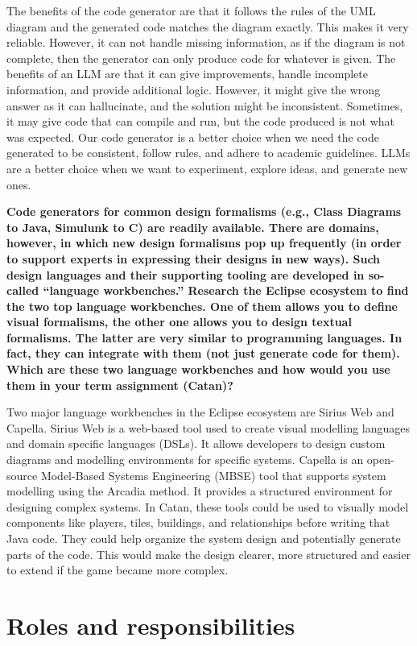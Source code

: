 The benefits of the code generator are that it follows the rules of the UML diagram and the generated code matches the diagram exactly. This makes it very reliable. However, it can not handle missing information, as if the diagram is not complete, then the generator can only produce code for whatever is given. The benefits of an LLM are that it can give improvements, handle incomplete information, and provide additional logic. However, it might give the wrong answer as it can hallucinate, and the solution might be inconsistent. Sometimes, it may give code that can compile and run, but the code produced is not what was expected. 
Our code generator is a better choice when we need the code generated to be consistent, follow rules, and adhere to academic guidelines. LLMs are a better choice when we want to experiment, explore ideas, and generate new ones.

\textbf{Code generators for common design formalisms (e.g., Class Diagrams to Java, Simulunk to C) are readily available. There are domains, however, in which new design formalisms pop up frequently (in order to support experts in expressing their designs in new ways). Such design languages and their supporting tooling are developed in so-called “language workbenches.” Research the Eclipse ecosystem to find the two top language workbenches. One of them allows you to define visual formalisms, the other one allows you to design textual formalisms. The latter are very similar to programming languages. In fact, they can integrate with them (not just generate code for them). Which are these two language workbenches and how would you use them in your term assignment (Catan)?}

Two major language workbenches in the Eclipse ecosystem are Sirius Web and Capella. 
Sirius Web is a web-based tool used to create visual modelling languages and domain specific languages (DSLs). It allows developers to design custom diagrams and modelling environments for specific systems. 
Capella is an open-source Model-Based Systems Engineering (MBSE) tool that supports system modelling using the Arcadia method. It provides a structured environment for designing complex systems. 
In Catan, these tools could be used to visually model components like players, tiles, buildings, and relationships before writing that Java code. They could help organize the system design and potentially generate parts of the code. This would make the design clearer, more structured and easier to extend if the game became more complex. 


\section{Roles and responsibilities}

